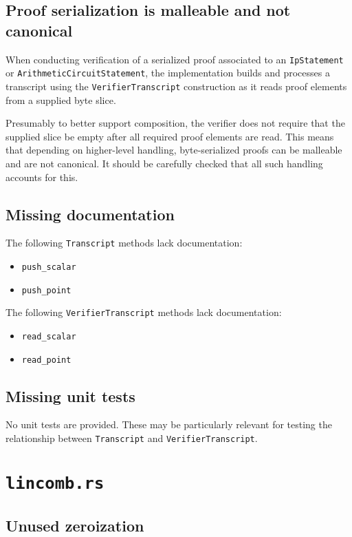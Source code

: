 \documentclass{article}
\begin{document}
\subsection{Proof serialization is malleable and not canonical}

When conducting verification of a serialized proof associated to an \texttt{IpStatement} or \texttt{ArithmeticCircuitStatement}, the implementation builds and processes a transcript using the \texttt{VerifierTranscript} construction as it reads proof elements from a supplied byte slice.

Presumably to better support composition, the verifier does not require that the supplied slice be empty after all required proof elements are read.
This means that depending on higher-level handling, byte-serialized proofs can be malleable and are not canonical.
It should be carefully checked that all such handling accounts for this.


\subsection{Missing documentation}

The following \texttt{Transcript} methods lack documentation:
\begin{itemize}
    \item \texttt{push\_scalar}
    \item \texttt{push\_point}
\end{itemize}

The following \texttt{VerifierTranscript} methods lack documentation:
\begin{itemize}
    \item \texttt{read\_scalar}
    \item \texttt{read\_point}
\end{itemize}


\subsection{Missing unit tests}

No unit tests are provided.
These may be particularly relevant for testing the relationship between \texttt{Transcript} and \texttt{VerifierTranscript}.


\section{\texttt{lincomb.rs}}

\subsection{Unused zeroization}
\end{document}

